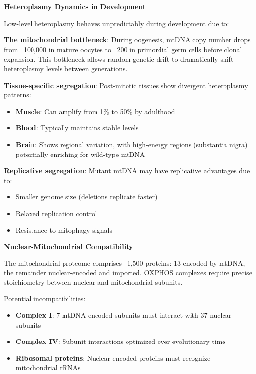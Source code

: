 \begin{technical}
\noindent\textbf{Heteroplasmy Dynamics in Development}

Low-level heteroplasmy behaves unpredictably during development due to:

\textbf{The mitochondrial bottleneck}: During oogenesis, mtDNA copy number drops from ~100,000 in mature oocytes to ~200 in primordial germ cells before clonal expansion. This bottleneck allows random genetic drift to dramatically shift heteroplasmy levels between generations.

\columnbreak

\textbf{Tissue-specific segregation}: Post-mitotic tissues show divergent heteroplasmy patterns:
\begin{itemize}[leftmargin=*]
\item \textbf{Muscle}: Can amplify from 1\% to 50\% by adulthood
\item \textbf{Blood}: Typically maintains stable levels
\item \textbf{Brain}: Shows regional variation, with high-energy regions (substantia nigra) potentially enriching for wild-type mtDNA
\end{itemize}

\textbf{Replicative segregation}: Mutant mtDNA may have replicative advantages due to:
\begin{itemize}[leftmargin=*]
\item Smaller genome size (deletions replicate faster)
\item Relaxed replication control
\item Resistance to mitophagy signals
\end{itemize}

\noindent\textbf{Nuclear-Mitochondrial Compatibility}

The mitochondrial proteome comprises ~1,500 proteins: 13 encoded by mtDNA, the remainder nuclear-encoded and imported. OXPHOS complexes require precise stoichiometry between nuclear and mitochondrial subunits.

Potential incompatibilities:
\begin{itemize}[leftmargin=*]
\item \textbf{Complex I}: 7 mtDNA-encoded subunits must interact with 37 nuclear subunits
\item \textbf{Complex IV}: Subunit interactions optimized over evolutionary time
\item \textbf{Ribosomal proteins}: Nuclear-encoded proteins must recognize mitochondrial rRNAs
\end{itemize}


\end{technical}
